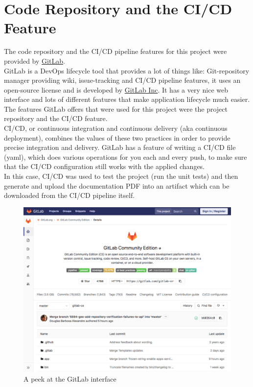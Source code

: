 \section{Code Repository and the CI/CD Feature}
\label{sec:GitLab}
The code repository and the CI/CD pipeline features for this project were provided by \href{https://gitlab.com/}{GitLab}.\\
GitLab is a DevOps lifecycle tool that provides a lot of things like: Git-repository manager providing wiki, issue-tracking and CI/CD pipeline features, it uses an open-source license and is developed by \href{https://about.gitlab.com/company/}{GitLab Inc}.
It has a very nice web interface and lots of different features that make application lifecycle much easier. The features GitLab offers that were used for this project were the project repository and the CI/CD feature.\\
\newline
CI/CD, or continuous integration and continuous delivery (aka continuous deployment), combines the values of these two practices in order to provide precise integration and delivery.
GitLab has a feature of writing a CI/CD file (yaml), which does various operations for you each and every push, to make sure that the CI/CD configuration still works with the applied changes.\\
In this case, CI/CD was used to test the project (run the unit tests) and then generate and upload the documentation PDF into an artifact which can be downloaded from the CI/CD pipeline itself.
\begin{figure}[H]
	\includegraphics[width=\linewidth]{./Images/Implementation/gitlab_view.png}
	\caption{A peek at the GitLab interface}
\end{figure}	
